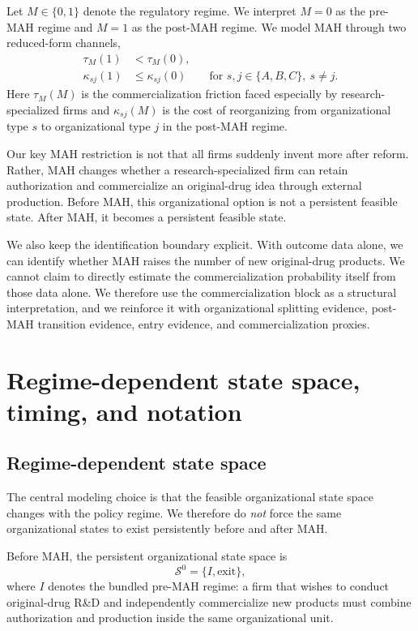 \documentclass[12pt]{article}
\newcommand{\1}{\mathbf{1}}
\newcommand{\Tpre}{\mathcal{S}^0}
\begin{document}
Let $M\in\{0,1\}$ denote the regulatory regime. We interpret $M=0$ as the pre-MAH regime and $M=1$ as the post-MAH regime. We model MAH through two reduced-form channels,
\begin{align}
\tau_M(1) &< \tau_M(0), \label{eq:tauM}\\
\kappa_{sj}(1) &\le \kappa_{sj}(0)
\qquad \text{for } s,j\in\{A,B,C\},\ s\neq j.
\label{eq:kappaM}
\end{align}
Here $\tau_M(M)$ is the commercialization friction faced especially by research-specialized firms and $\kappa_{sj}(M)$ is the cost of reorganizing from organizational type $s$ to organizational type $j$ in the post-MAH regime.

Our key MAH restriction is not that all firms suddenly invent more after reform. Rather, MAH changes whether a research-specialized firm can retain authorization and commercialize an original-drug idea through external production. Before MAH, this organizational option is not a persistent feasible state. After MAH, it becomes a persistent feasible state.

We also keep the identification boundary explicit. With outcome data alone, we can identify whether MAH raises the number of new original-drug products. We cannot claim to directly estimate the commercialization probability itself from those data alone. We therefore use the commercialization block as a structural interpretation, and we reinforce it with organizational splitting evidence, post-MAH transition evidence, entry evidence, and commercialization proxies.

\section{Regime-dependent state space, timing, and notation}

\subsection{Regime-dependent state space}

The central modeling choice is that the feasible organizational state space changes with the policy regime. We therefore do \emph{not} force the same organizational states to exist persistently before and after MAH.

Before MAH, the persistent organizational state space is
\begin{equation}
\Tpre=\{I,\mathrm{exit}\},
\label{eq:pre_states}
\end{equation}
where $I$ denotes the bundled pre-MAH regime: a firm that wishes to conduct original-drug R\&D and independently commercialize new products must combine authorization and production inside the same organizational unit.
\end{document}

